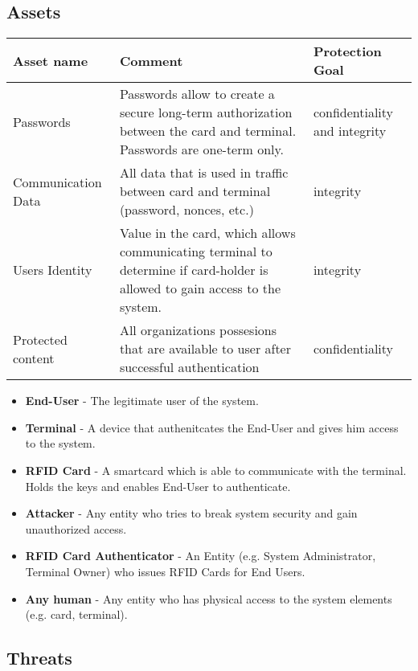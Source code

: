 \documentclass[10pt,titlepage]{article}
\begin{document}
\subsection{Assets}
\begin{table}[!ht]
	\begin{tabular}{| p{3cm} | p{7cm} | p{3cm} |}
\hline
			Asset name & Comment & Protection Goal \\ \hline
			Passwords & Passwords allow to create a secure long-term authorization between the card and terminal. Passwords are one-term only. & confidentiality and integrity \\ \hline
			Communication Data & All data that is used in traffic between card and terminal (password, nonces, etc.) & integrity \\ \hline
			Users Identity & Value in the card, which allows communicating terminal to determine if card-holder is allowed to gain access to the system. & integrity \\ \hline
			Protected content & All organizations possesions that are available to user after successful authentication & confidentiality \\ \hline 
			
\end{tabular}
\end{table}
\begin{itemize}
\item \textbf{End-User} - The legitimate user of the system.

\item \textbf{Terminal} - A device that authenitcates the End-User and gives him access to the system.

\item \textbf{RFID Card} - A smartcard which is able to communicate with the terminal. Holds the keys and enables End-User to authenticate.

\item \textbf{Attacker} - Any entity who tries to break system security and gain unauthorized access.

\item \textbf{RFID Card Authenticator} - An Entity (e.g. System Administrator, Terminal Owner) who issues RFID Cards for End Users.

\item \textbf{Any human} - Any entity who has physical access to the system elements (e.g. card, terminal).
\end{itemize}

\subsection{Threats}
\end{document}
